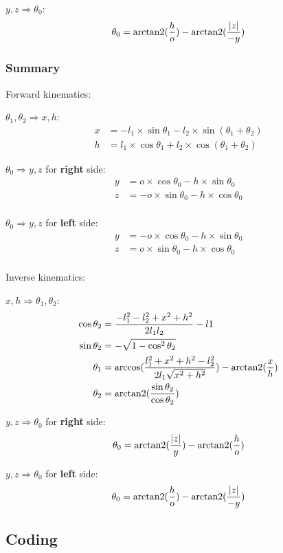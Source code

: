 \indent\indent
$y, z \Rightarrow \theta_0$:
\begin{equation*}
   \theta_0 = \operatorname{arctan2}(\frac{h}{o}) - \operatorname{arctan2}(\frac{\lvert z \lvert}{-y})
\end{equation*}

\subsubsection{Summary}

\noindent
Forward kinematics:

$\theta_1, \theta_2 \Rightarrow x, h$:
\begin{align}
x &= -l_1 \times \sin\theta_1 - l_2 \times \sin(\theta_1 + \theta_2) \\
h &=  l_1 \times \cos\theta_1 + l_2 \times \cos(\theta_1 + \theta_2)
\end{align}

$\theta_0 \Rightarrow y, z$ for \textbf{right} side:
\begin{align}
y &=  o \times \cos\theta_0 - h \times \sin\theta_0 \\
z &= -o \times \sin\theta_0 - h \times \cos\theta_0 \\
\end{align}

$\theta_0 \Rightarrow y, z$ for \textbf{left} side:
\begin{align}
y &= -o \times \cos\theta_0 - h \times \sin\theta_0 \\
z &=  o \times \sin\theta_0 - h \times \cos\theta_0 \\
\end{align}

\noindent
Inverse kinematics:

$x, h \Rightarrow \theta_1, \theta_2$:
\begin{align}
\cos\theta_2 &= \frac{-l_1^2 - l_2^2 + x^2 + h^2}{2 l_1 l_2} -l1 \\
\sin\theta_2 &= -\sqrt{1 - \cos^2\theta_2} \\
\theta_1 &= \arccos(\frac{l_1^2 + x^2 + h^2 - l_2^2}{2 l_1 \sqrt{x^2 + h^2}}) - \operatorname{arctan2}(\frac{x}{h}) \\
\theta_2 &= \operatorname{arctan2}(\frac{\sin\theta_2}{\cos\theta_2})
\end{align}

$y, z \Rightarrow \theta_0$ for \textbf{right} side:
\begin{equation}
   \theta_0 = \operatorname{arctan2}(\frac{\lvert z \lvert}{y}) - \operatorname{arctan2}(\frac{h}{o})
\end{equation}

$y, z \Rightarrow \theta_0$ for \textbf{left} side:
\begin{equation}
   \theta_0 = \operatorname{arctan2}(\frac{h}{o}) - \operatorname{arctan2}(\frac{\lvert z \lvert}{-y})
\end{equation}

\subsection{Coding}


